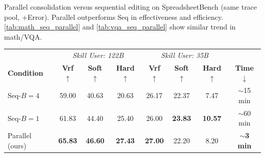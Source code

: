 \centering
\small
\setlength{\tabcolsep}{4pt}
\caption{Parallel consolidation versus sequential editing on SpreadsheetBench (same trace pool, +Error). Parallel outperforms Seq in effectiveness and efficiency. \cref{tab:math_seq_parallel} and \cref{tab:vqa_seq_parallel} show similar trend in math/VQA.}
\label{tab:seq_parallel}
\begin{tabular}{@{}l ccc ccc c@{}}
\toprule
& \multicolumn{3}{c}{\textit{Skill User: 122B}}
& \multicolumn{3}{c}{\textit{Skill User: 35B}} & \\
\cmidrule(lr){2-4}\cmidrule(lr){5-7}
\textbf{Condition}
    & \textbf{Vrf}$\uparrow$ & \textbf{Soft}$\uparrow$ & \textbf{Hard}$\uparrow$
    & \textbf{Vrf}$\uparrow$ & \textbf{Soft}$\uparrow$ & \textbf{Hard}$\uparrow$
    & \textbf{Time}$\downarrow$ \\
\midrule
Seq-$B{=}4$           & 59.00 & 40.63 & 20.63 & 26.17 & 22.37 &  7.47 & $\sim$15 min \\
Seq-$B{=}1$           & 61.83 & 44.40 & 25.40 & 26.00 & \textbf{23.83} & \textbf{10.57} & $\sim$60 min \\
Parallel (ours)        & \textbf{65.83} & \textbf{46.60} & \textbf{27.43} & \textbf{27.00} & 22.20 &  8.20 & \textbf{$\sim$3 min} \\
\bottomrule
\end{tabular}
